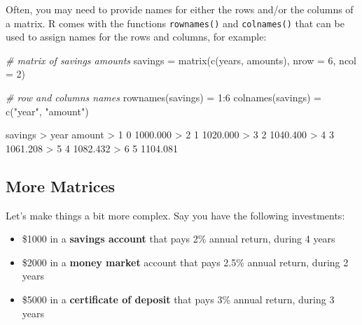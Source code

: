 \documentclass[
]{book}
\newenvironment{Shaded}{\begin{snugshade}}{\end{snugshade}}
\newcommand{\AttributeTok}[1]{\textcolor[rgb]{0.77,0.63,0.00}{#1}}
\newcommand{\CommentTok}[1]{\textcolor[rgb]{0.56,0.35,0.01}{\textit{#1}}}
\newcommand{\DecValTok}[1]{\textcolor[rgb]{0.00,0.00,0.81}{#1}}
\newcommand{\FloatTok}[1]{\textcolor[rgb]{0.00,0.00,0.81}{#1}}
\newcommand{\FunctionTok}[1]{\textcolor[rgb]{0.00,0.00,0.00}{#1}}
\newcommand{\NormalTok}[1]{#1}
\newcommand{\OtherTok}[1]{\textcolor[rgb]{0.56,0.35,0.01}{#1}}
\newcommand{\SpecialCharTok}[1]{\textcolor[rgb]{0.00,0.00,0.00}{#1}}
\newcommand{\StringTok}[1]{\textcolor[rgb]{0.31,0.60,0.02}{#1}}
\begin{document}
Often, you may need to provide names for either the rows and/or the columns of
a matrix. R comes with the functions \texttt{rownames()} and \texttt{colnames()} that can be
used to assign names for the rows and columns, for example:

\begin{Shaded}
\begin{Highlighting}[]
\CommentTok{\# matrix of savings amounts}
\NormalTok{savings }\OtherTok{=} \FunctionTok{matrix}\NormalTok{(}\FunctionTok{c}\NormalTok{(years, amounts), }\AttributeTok{nrow =} \DecValTok{6}\NormalTok{, }\AttributeTok{ncol =} \DecValTok{2}\NormalTok{)}

\CommentTok{\# row and columns names}
\FunctionTok{rownames}\NormalTok{(savings) }\OtherTok{=} \DecValTok{1}\SpecialCharTok{:}\DecValTok{6}
\FunctionTok{colnames}\NormalTok{(savings) }\OtherTok{=} \FunctionTok{c}\NormalTok{(}\StringTok{"year"}\NormalTok{, }\StringTok{"amount"}\NormalTok{)}

\NormalTok{savings}
\SpecialCharTok{\textgreater{}}\NormalTok{   year   amount}
\SpecialCharTok{\textgreater{}} \DecValTok{1}    \DecValTok{0} \FloatTok{1000.000}
\SpecialCharTok{\textgreater{}} \DecValTok{2}    \DecValTok{1} \FloatTok{1020.000}
\SpecialCharTok{\textgreater{}} \DecValTok{3}    \DecValTok{2} \FloatTok{1040.400}
\SpecialCharTok{\textgreater{}} \DecValTok{4}    \DecValTok{3} \FloatTok{1061.208}
\SpecialCharTok{\textgreater{}} \DecValTok{5}    \DecValTok{4} \FloatTok{1082.432}
\SpecialCharTok{\textgreater{}} \DecValTok{6}    \DecValTok{5} \FloatTok{1104.081}
\end{Highlighting}
\end{Shaded}

\hypertarget{more-matrices}{%
\subsection{More Matrices}\label{more-matrices}}

Let's make things a bit more complex. Say you have the following investments:

\begin{itemize}
\item
  \$1000 in a \textbf{savings account} that pays 2\% annual return, during 4 years
\item
  \$2000 in a \textbf{money market} account that pays 2.5\% annual return, during
  2 years
\item
  \$5000 in a \textbf{certificate of deposit} that pays 3\% annual return, during
  3 years
\end{itemize}
\end{document}
